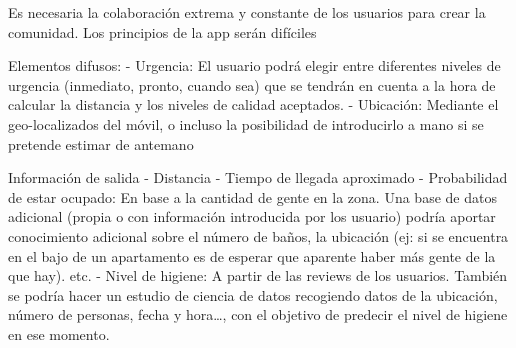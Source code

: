 \documentclass[13pt,a4paper]{article}
\begin{document}
    
    
    \tableofcontents
    \thispagestyle{empty}				%

    \newpage






Es necesaria la colaboración extrema y constante de los usuarios para crear la comunidad. Los principios de la app serán difíciles

Elementos difusos:
- Urgencia: El usuario podrá elegir entre diferentes niveles de urgencia (inmediato, pronto, cuando sea) que se tendrán en cuenta a la hora de calcular la distancia y los niveles de calidad aceptados.
- Ubicación: Mediante el geo-localizados del móvil, o incluso la posibilidad de introducirlo a mano si se pretende estimar de antemano


Información de salida
- Distancia
- Tiempo de llegada aproximado
- Probabilidad de estar ocupado: En base a la cantidad de gente en la zona. Una base de datos adicional (propia o con información introducida por los usuario) podría aportar conocimiento adicional sobre el número de baños, la ubicación (ej: si se encuentra en el bajo de un apartamento es de esperar que aparente haber más gente de la que hay). etc.
- Nivel de higiene: A partir de las reviews de los usuarios. También se podría hacer un estudio de ciencia de datos recogiendo datos de la ubicación, número de personas, fecha y hora\dots, con el objetivo de predecir el nivel de higiene en ese momento.
\end{document}
